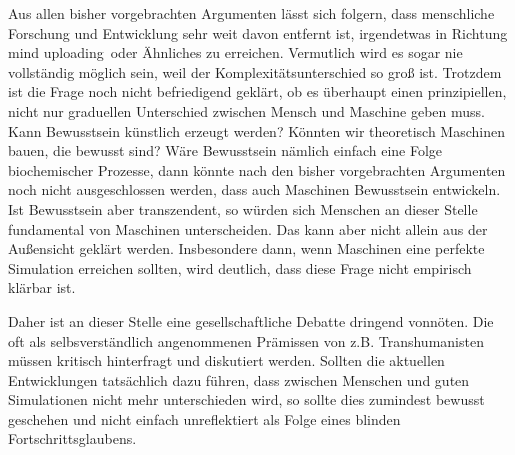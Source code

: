 \documentclass[12pt]{article}
\begin{document}
Aus allen bisher vorgebrachten Argumenten lässt sich folgern, dass menschliche Forschung und Entwicklung sehr weit davon entfernt ist, irgendetwas in Richtung
\glqq mind uploading\grqq\ oder Ähnliches zu erreichen. Vermutlich wird es sogar nie vollständig möglich sein, weil der Komplexitätsunterschied so groß ist.
Trotzdem ist die Frage noch nicht befriedigend geklärt, ob es überhaupt einen prinzipiellen, nicht nur graduellen Unterschied zwischen Mensch und Maschine geben muss.
Kann Bewusstsein künstlich erzeugt werden? Könnten wir theoretisch Maschinen bauen, die bewusst sind?
Wäre Bewusstsein nämlich einfach eine Folge biochemischer Prozesse, dann könnte nach den bisher vorgebrachten Argumenten noch nicht ausgeschlossen werden,
dass auch Maschinen Bewusstsein entwickeln. 
Ist Bewusstsein aber transzendent, so würden sich Menschen an dieser Stelle fundamental von Maschinen unterscheiden.
Das kann aber nicht allein aus der Außensicht geklärt werden. Insbesondere dann, wenn Maschinen eine perfekte Simulation erreichen sollten, wird deutlich, dass diese Frage nicht empirisch klärbar ist.

Daher ist an dieser Stelle eine gesellschaftliche Debatte dringend vonnöten. 
Die oft als selbsverständlich angenommenen Prämissen von z.B. Transhumanisten müssen kritisch hinterfragt und diskutiert werden.
Sollten die aktuellen Entwicklungen tatsächlich dazu führen, dass zwischen Menschen und guten Simulationen nicht mehr unterschieden wird,
so sollte dies zumindest bewusst geschehen und nicht einfach unreflektiert als Folge eines blinden Fortschrittsglaubens.
\end{document}

